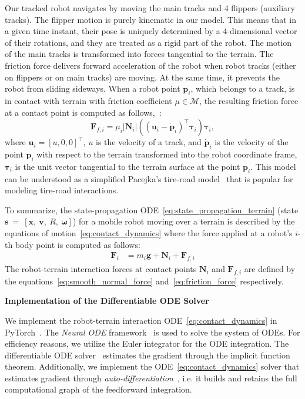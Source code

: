 Our tracked robot navigates by moving the main tracks and 4 flippers (auxiliary tracks).
The flipper motion is purely kinematic in our model.
This means that in a given time instant, their pose is uniquely determined by a $4$-dimensional vector
of their rotations, and they are treated as a rigid part of the robot.
The motion of the main tracks is transformed into forces tangential to the terrain.
The friction force delivers forward acceleration of the robot when robot tracks
(either on flippers or on main tracks) are moving.
At the same time, it prevents the robot from sliding sideways.
When a robot point $\mathbf{p}_i$, which belongs to a track, is in contact with terrain with
friction coefficient $\mu\in\mathcal{M}$, the resulting friction force at a contact point is computed as follows,~\cite{yong2012vehicle}:
\begin{equation}\label{eq:friction_force}
    \mathbf{F}_{f, i} = \mu_i |\mathbf{N}_i| ((\mathbf{u}_i - \mathbf{\dot{p}}_i)^\top\boldsymbol{\tau}_i)\boldsymbol{\tau}_i,
\end{equation}
where $\mathbf{u}_i = [u, 0, 0]^\top$, $u$ is the velocity of a track, and $\mathbf{\dot{p}}_i$ is the velocity of the point $\mathbf{p}_i$
with respect to the terrain transformed into the robot coordinate frame,
$\boldsymbol{\tau}_i$ is the unit vector tangential to the terrain surface at the point $\mathbf{p}_i$.
This model can be understood as a simplified Pacejka's tire-road model~\cite{pacejka-book-2012}
that is popular for modeling tire-road interactions.

To summarize, the state-propagation ODE~\eqref{eq:state_propagation_terrain}
(state $\mathbf{s}~=~[\mathbf{x},~\mathbf{v},~R,~\boldsymbol{\omega}]$) for a mobile robot moving over a terrain
is described by the equations of motion~\eqref{eq:contact_dynamics} where the force applied at a robot's $i$-th body point is computed as follows:
\begin{equation}\label{eq:forces}
    \begin{split}
        \mathbf{F}_i &= m_i\mathbf{g} + \mathbf{N}_i + \mathbf{F}_{f, i}
    \end{split}
\end{equation}
The robot-terrain interaction forces at contact points $\mathbf{N}_i$ and $\mathbf{F}_{f, i}$
are defined by the equations~\eqref{eq:smooth_normal_force} and~\eqref{eq:friction_force} respectively.


\textbf{Implementation of the Differentiable ODE Solver}

We implement the robot-terrain interaction ODE~\eqref{eq:contact_dynamics} in PyTorch~\cite{Paszke-NIPS-2019}.
The \textit{Neural ODE} framework~\cite{neural-ode-2021} is used to solve the system of ODEs.
For efficiency reasons, we utilize the Euler integrator for the ODE integration.
The differentiable ODE solver~\cite{neural-ode-2021} estimates the gradient through the implicit function theorem.
Additionally, we implement the ODE~\eqref{eq:contact_dynamics} solver that
estimates gradient through \textit{auto-differentiation}~\cite{Paszke-NIPS-2019},
i.e. it builds and retains the full computational graph of the feedforward integration.
